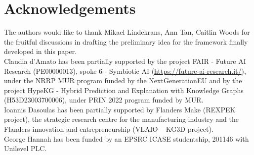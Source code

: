 \documentclass[sn-mathphys-num]{sn-jnl}%
\begin{document}
\section*{Acknowledgements}
The authors would like to thank Mikael Lindekrans, Ann Tan, Caitlin Woods for the fruitful discussions in drafting the preliminary idea for the framework finally developed in this paper. \\ 
Claudia d'Amato has been partially supported by the project FAIR - Future AI Research (PE00000013), spoke 6 - Symbiotic AI (\url{https://future-ai-research.it/}), under the NRRP MUR program funded by the NextGenerationEU and by the project HypeKG - Hybrid Prediction and Explanation with Knowledge Graphs (H53D23003700006), under PRIN 2022 program funded by MUR.\\
Ioannis Dasoulas has been partially supported by Flanders Make (REXPEK project), the strategic research centre for the manufacturing industry and the Flanders innovation and entrepreneurship (VLAIO -- KG3D project).\\
George Hannah has been funded by an EPSRC ICASE studentship, 201146 with Unilevel PLC.
 

\end{document}
